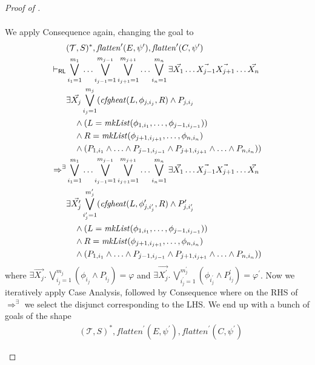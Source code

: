 \begin{proof}[Proof of ]
\begin{enumerate}
\begin{align*}
    \end{align*}
    We apply Consequence again, changing the goal to
    \begin{align*}
        & (\mathcal{T}, S)^*, \mathit{flatten}^\prime(E, \psi^\prime), \mathit{flatten}^\prime(C, \psi^\prime)
        \\ \vdash_{\mathsf{RL}} &
        \bigvee_{i_1=1}^{m_1} \ldots \bigvee_{i_{j-1}=1}^{m_{j-1}}
        \bigvee_{i_{j+1}=1}^{m_{j+1}} \ldots \bigvee_{i_n=1}^{m_n}
        \exists \vec{X_1} \ldots \vec{X_{j-1}} \vec{X_{j+1}} \ldots \vec{X_n}
        \\& \exists \vec{X_j} \bigvee_{i_j=1}^{m_j} (\mathit{cfgheat}(L, \phi_{j, i_j}, R) \land P_{j, i_j}
        \\&\quad \land (L = \mathit{mkList}(\phi_{1, i_1}, \ldots, \phi_{j-1, i_{j-1}}))
        \\&\quad \land R = \mathit{mkList}(\phi_{j+1, i_{j+1}}, \ldots, \phi_{n, i_{n}})
        \\&\quad \land (P_{1, i_1} \land \ldots \land P_{j-1, i_{j-1}} \land P_{j+1, i_{j+1}} \land \ldots \land P_{n, i_n}))
        \\ \Rightarrow^\exists &
        \bigvee_{i_1=1}^{m_1} \ldots \bigvee_{i_{j-1}=1}^{m_{j-1}}
        \bigvee_{i_{j+1}=1}^{m_{j+1}} \ldots \bigvee_{i_n=1}^{m_n}
        \exists \vec{X_1} \ldots \vec{X_{j-1}} \vec{X_{j+1}} \ldots \vec{X_n}
        \\& \exists \vec{X^\prime_j} \bigvee_{i^\prime_j=1}^{m^\prime_j} (\mathit{cfgheat}(L, \phi^\prime_{j, i^\prime_j}, R) \land P^\prime_{j, i^\prime_j}
        \\&\quad \land (L = \mathit{mkList}(\phi_{1, i_1}, \ldots, \phi_{j-1, i_{j-1}}))
        \\&\quad \land R = \mathit{mkList}(\phi_{j+1, i_{j+1}}, \ldots, \phi_{n, i_{n}})
        \\&\quad \land (P_{1, i_1} \land \ldots \land P_{j-1, i_{j-1}} \land P_{j+1, i_{j+1}} \land \ldots \land P_{n, i_n}))
    \end{align*}
    where $\exists \vec{X_j}.\, \bigvee_{i_j = 1}^{m_j} (\phi_{i_j} \land P_{i_j}) = \varphi $
    and $\exists \vec{X_j^\prime}.\, \bigvee_{i_j^\prime = 1}^{m_j^\prime} (\phi_{i_j^\prime} \land P_{i_j}^\prime) = \varphi^\prime$.
    Now we iteratively apply Case Analysis, followed by Consequence where on the RHS of $\Rightarrow^\exists$ we select the disjunct corresponding to the LHS.
    We end up with a bunch of goals of the shape
    \begin{align*}
        & (\mathcal{T}, S)^*, \mathit{flatten}^\prime(E, \psi^\prime), \mathit{flatten}^\prime(C, \psi^\prime)

\end{align*}
\end{enumerate}
\end{proof}
